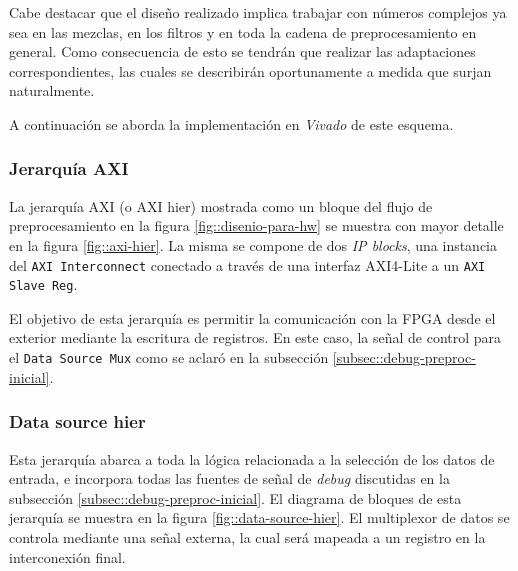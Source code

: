 \documentclass[../../main.tex]{subfiles}
\begin{document}
Cabe destacar que el diseño realizado implica trabajar con números complejos ya sea en las mezclas, en los filtros y en toda la cadena de preprocesamiento en general. Como consecuencia de esto se tendrán que realizar las adaptaciones correspondientes, las cuales se describirán oportunamente a medida que surjan naturalmente.

A continuación se aborda la implementación en \textit{Vivado} de este esquema.

\subsubsection{Jerarquía AXI}
La jerarquía AXI (o AXI hier) mostrada como un bloque del flujo de preprocesamiento en la figura \ref{fig::disenio-para-hw} se muestra con mayor detalle en la figura \ref{fig::axi-hier}. La misma se compone de dos \textit{IP blocks}, una instancia del \texttt{AXI Interconnect} conectado a través de una interfaz AXI4-Lite a un \texttt{AXI Slave Reg}. 

El objetivo de esta jerarquía es permitir la comunicación con la FPGA desde el exterior mediante la escritura de registros. En este caso, la señal de control para el \texttt{Data Source Mux} como se aclaró en la subsección \ref{subsec::debug-preproc-inicial}.


\subsubsection{Data source hier}
Esta jerarquía abarca a toda la lógica relacionada a la selección de los datos de entrada, e incorpora todas las fuentes de señal de \textit{debug} discutidas en la subsección \ref{subsec::debug-preproc-inicial}. El diagrama de bloques de esta jerarquía se muestra en la figura \ref{fig::data-source-hier}. El multiplexor de datos se controla mediante una señal externa, la cual será mapeada a un registro en la interconexión final.
\end{document}
